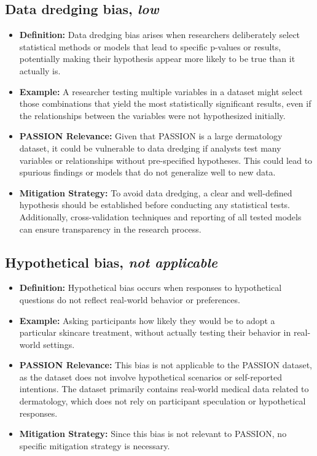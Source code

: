 \begin{refsection}
		\subsection{Data dredging bias, \textit{low}}
		\begin{itemize}
			\item \textbf{Definition:} Data dredging bias arises when researchers deliberately select statistical methods or models that lead to specific p-values or results, potentially making their hypothesis appear more likely to be true than it actually is.
			\item \textbf{Example:} A researcher testing multiple variables in a dataset might select those combinations that yield the most statistically significant results, even if the relationships between the variables were not hypothesized initially.
			\item \textbf{PASSION Relevance:} Given that PASSION is a large dermatology dataset, it could be vulnerable to data dredging if analysts test many variables or relationships without pre-specified hypotheses. This could lead to spurious findings or models that do not generalize well to new data.
			\item \textbf{Mitigation Strategy:} To avoid data dredging, a clear and well-defined hypothesis should be established before conducting any statistical tests. Additionally, cross-validation techniques and reporting of all tested models can ensure transparency in the research process.
		\end{itemize}
		
		\subsection{Hypothetical bias, \textit{not applicable}}
		\begin{itemize}
			\item \textbf{Definition:} Hypothetical bias occurs when responses to hypothetical questions do not reflect real-world behavior or preferences.
			\item \textbf{Example:} Asking participants how likely they would be to adopt a particular skincare treatment, without actually testing their behavior in real-world settings.
			\item \textbf{PASSION Relevance:} This bias is not applicable to the PASSION dataset, as the dataset does not involve hypothetical scenarios or self-reported intentions. The dataset primarily contains real-world medical data related to dermatology, which does not rely on participant speculation or hypothetical responses.
			\item \textbf{Mitigation Strategy:} Since this bias is not relevant to PASSION, no specific mitigation strategy is necessary.
		\end{itemize}
		

\end{refsection}
